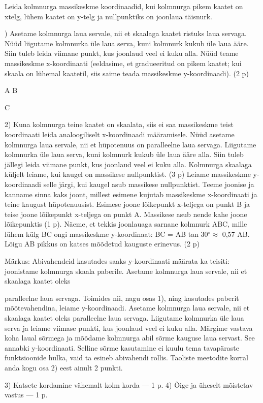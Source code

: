 
Leida kolmnurga massikeskme koordinaadid, kui kolmnurga pikem kaatet on xtelg, lühem kaatet on y-telg ja nullpunktiks on joonlaua täisnurk.

\hint

) Asetame kolmnurga laua servale, nii et skaalaga kaatet ristuks laua servaga. Nüüd liigutame kolmnurka üle laua serva, kuni kolmnurk kukub üle laua ääre. Siin tuleb leida viimane punkt, kus joonlaud veel ei kuku alla. Nüüd teame massikeskme x-koordinaati (eeldasime, et gradueeritud on pikem kaatet; kui skaala on lühemal kaatetil, siis saime teada massikeskme y-koordinaadi). (2 p)

A B

C

2) Kuna kolmnurga teine kaatet on skaalata, siis ei saa massikeskme teist koordinaati leida analoogiliselt x-koordinaadi määramisele. Nüüd asetame kolmnurga laua servale, nii et hüpotenuus on paralleelne laua servaga. Liigutame kolmnurka üle laua serva, kuni kolmnurk kukub üle laua ääre alla. Siin tuleb jällegi leida viimane punkt, kus joonlaud veel ei kuku alla. Kolmnurga skaalaga küljelt leiame, kui kaugel on massikese nullpunktist. (3 p) Leiame massikeskme y-koordinaadi selle järgi, kui kaugel asub massikese nullpunktist. Teeme joonise ja kanname sinna kaks joont, millest esimene kujutab massikeskme x-koordinaati ja teine kaugust hüpotenuusist. Esimese joone lõikepunkt x-teljega on punkt B ja teise joone lõikepunkt x-teljega on punkt A. Massikese asub nende kahe joone lõikepunktis (1 p). Näeme, et tekkis joonlauaga sarnane kolmnurk ABC, mille lühem külg BC ongi massikeskme y-koordinaat: BC = AB tan 30$^\circ \approx$ 0,57 AB. Lõigu AB pikkus on katses mõõdetud kauguste erinevus. (2 p)

Märkus: Abivahendeid kasutades saaks y-koordinaati määrata ka teisiti: joonistame kolmnurga skaala paberile. Asetame kolmnurga laua servale, nii et skaalaga kaatet oleks

paralleelne laua servaga. Toimides nii, nagu osas 1), ning kasutades paberit mõõtevahendina, leiame y-koordinaadi. Asetame kolmnurga laua servale, nii et skaalaga kaatet oleks paralleelne laua servaga. Liigutame kolmnurka üle laua serva ja leiame viimase punkti, kus joonlaud veel ei kuku alla. Märgime vastava koha laual sõrmega ja mõõdame kolmnurga abil sõrme kauguse laua servast. See annabki y-koordinaati. Selline sõrme kasutamine ei kuulu tema tavapäraste funktsioonide hulka, vaid ta esineb abivahendi rollis. Taoliste meetodite korral anda kogu osa 2) eest ainult 2 punkti.

3) Katsete kordamine vähemalt kolm korda --- 1 p. 4) Õige ja üheselt mõistetav vastus --- 1 p.
\probend
